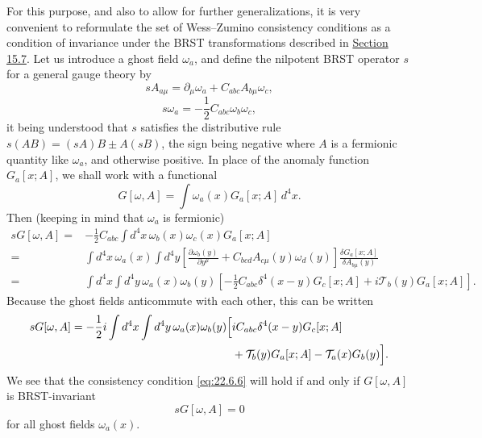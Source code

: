 For this purpose, and also to allow for further generalizations, it is very
convenient to reformulate the set of Wess--Zumino consistency conditions
as a condition of invariance under the BRST transformations described in
\hyperref[sec:15.7]{Section 15.7}. Let us introduce a ghost field
$\omega_a$, and define the nilpotent BRST operator $s$ for a general
gauge theory by
\begin{equation}
 sA_{a\mu}
 =\partial_\mu\omega_a
 +C_{abc}A_{b\mu}\omega_c,
 \tag{22.6.7}\label{eq:22.6.7}
\end{equation}
\begin{equation}
 s\omega_a
 =-\frac12 C_{abc}\omega_b\omega_c,
 \tag{22.6.8}\label{eq:22.6.8}
\end{equation}
it being understood that $s$ satisfies the distributive rule
$s(AB)=(sA)B\pm A(sB)$, the sign being negative where $A$ is a fermionic
quantity like $\omega_a$, and otherwise positive. In place of the
anomaly function $G_a[x;A]$, we shall work with a functional
\begin{equation}
 G[\omega,A]
 =\int\omega_a(x)G_a[x;A]\,d^4x.
 \tag{22.6.9}\label{eq:22.6.9}
\end{equation}
Then (keeping in mind that $\omega_a$ is fermionic)
\begin{align*}
 sG[\omega,A]
 ={}&-\frac12 C_{abc}
 \int d^4x\,\omega_b(x)\omega_c(x)G_a[x;A]
 \\
 ={}&\int d^4x\,\omega_a(x)\int d^4y
 \left[
 \frac{\partial\omega_b(y)}{\partial y^\mu}
 +C_{bcd}A_{c\mu}(y)\omega_d(y)
 \right]
 \frac{\delta G_a[x;A]}{\delta A_{b\mu}(y)}
 \\
 ={}&\int d^4x\int d^4y\,\omega_a(x)\omega_b(y)
 \left[
 -\frac12 C_{abc}\delta^4(x-y)G_c[x;A]
 +i\mathcal T_b(y)G_a[x;A]
 \right].
\end{align*}
Because the ghost fields anticommute with each other, this can be written
\[
 \begin{aligned}
 sG[\omega,A]
 =-\frac12 i\int d^4x\int d^4y\,
 \omega_a(x)\omega_b(y)
 \Bigl[
 &iC_{abc}\delta^4(x-y)G_c[x;A]
 \\
 &+\mathcal T_b(y)G_a[x;A]
 -\mathcal T_a(x)G_b(y)
 \Bigr].
 \end{aligned}
\]
We see that the consistency condition \eqref{eq:22.6.6} will hold if and
only if $G[\omega,A]$ is BRST-invariant
\begin{equation}
 sG[\omega,A]=0
 \tag{22.6.10}\label{eq:22.6.10}
\end{equation}
for all ghost fields $\omega_a(x)$.

